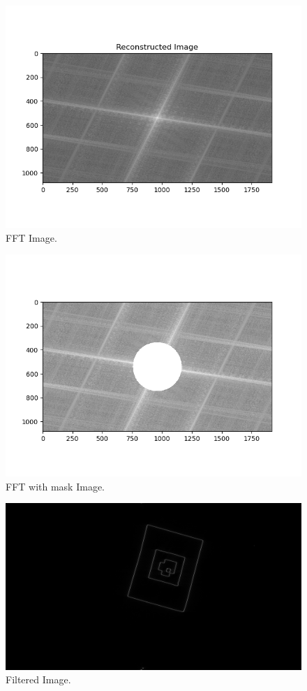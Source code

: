 \documentclass[11pt]{article}
\begin{document}
\begin{description}
\begin{figure}[!htbp]
  \centering
	\includegraphics[width=1\textwidth]{FFT}
	\caption{FFT Image.} 
\end{figure}
\begin{figure}[!htbp]
  \centering
	\includegraphics[width=1\textwidth]{FFTmasked}
	\caption{FFT with mask Image.} 
\end{figure}
\begin{figure}[!htbp]
  \centering
	\includegraphics[width=1\textwidth]{FFTimage}
	\caption{Filtered Image.} 
\end{figure}

\end{description}
\end{document}
